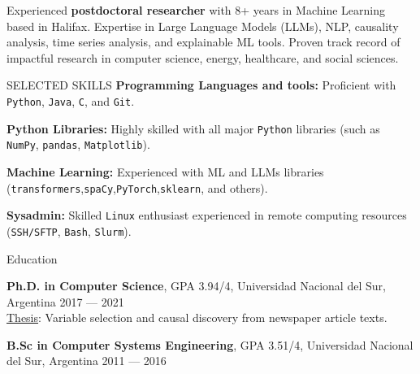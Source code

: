 \documentclass{resume} %
\begin{document}
\vspace{-0.3cm}
\begin{rSection}{}
Experienced \textbf{postdoctoral researcher} with 8+ years in Machine Learning based in Halifax. Expertise in Large Language Models (LLMs), NLP, causality analysis, time series analysis, and explainable ML tools. Proven track record of impactful research in computer science, energy, healthcare, and social sciences.
\end{rSection}





\vspace{-0.2cm}
\begin{rSection}{SELECTED SKILLS}
\textbf{Programming Languages and tools:} Proficient with \texttt{Python}, \texttt{Java}, \texttt{C}, and \texttt{Git}.
\vspace{-0.25cm}

\textbf{Python Libraries:} Highly skilled with all major \texttt{Python} libraries (such as \texttt{NumPy}, \texttt{pandas}, \texttt{Matplotlib}).
\vspace{-0.25cm}

\textbf{Machine Learning:} Experienced with ML and LLMs libraries (\texttt{transformers},\texttt{spaCy},\texttt{PyTorch},\texttt{sklearn}, and others).
\vspace{-0.75cm}

\textbf{Sysadmin:} Skilled \texttt{Linux} enthusiast experienced in remote computing resources (\texttt{SSH/SFTP}, \texttt{Bash}, \texttt{Slurm}).
\end{rSection}

\vspace{-0.3cm}
\begin{rSection}{Education}

{\bf Ph.D. in Computer Science}, GPA 3.94/4, Universidad Nacional del Sur, Argentina \hfill {2017 --- 2021}\\
\underline{Thesis}: Variable selection and causal discovery from  newspaper article texts.\\

\vspace{-0.6cm}


{\bf B.Sc in Computer Systems Engineering}, GPA 3.51/4, Universidad Nacional del Sur, Argentina \hfill {2011 --- 2016}\\
\vspace{-0.2cm}


\end{rSection}
\end{document}
